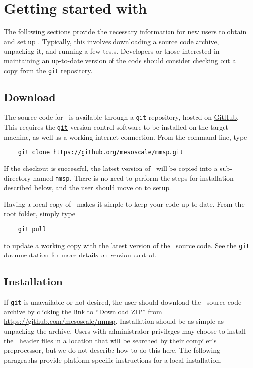 
\chapter{Getting started with \MMSP}
The following sections provide the necessary information for new users to obtain and set up \MMSP.  Typically, this involves downloading a source code archive, unpacking it, and running a few tests.  Developers or those interested in maintaining an up-to-date version of the code should consider checking out a copy from the {\tt git} repository.

\section{Download}
The source code for \MMSP\ is available through a {\tt git} repository, hosted on \href{https://github.com/mesoscale/mmsp}{GitHub}.  This requires the \href{http://www.git-scm.com}{\tt git} version control software to be installed on the target machine, as well as a working internet connection.  From the command line, type
\begin{shadebox}
\begin{verbatim}
    git clone https://github.org/mesoscale/mmsp.git
\end{verbatim}
\end{shadebox}
If the checkout is successful, the latest version of \MMSP\ will be copied into a sub-directory named {\tt mmsp}. There is no need to perform the steps for installation described below, and the user should move on to setup.

Having a local copy of \MMSP\ makes it simple to keep your code up-to-date.  From the root folder, simply type
\begin{shadebox}
\begin{verbatim}
    git pull
\end{verbatim}
\end{shadebox}
to update a working copy with the latest version of the \MMSP\ source code.  See the {\tt git} documentation for more details on version control.

\section{Installation}
If {\tt git} is unavailable or not desired, the user should download the \MMSP\ source code archive by clicking the link to ``Download ZIP'' from  \href{https://github.com/mesoscale/mmsp}{https://github.com/mesoscale/mmsp}.  Installation should be as simple as unpacking the archive.  Users with administrator privileges may choose to install the \MMSP\ header files in a location that will be searched by their compiler's preprocessor, but we do not describe how to do this here.  The following paragraphs provide platform-specific instructions for a local installation.

